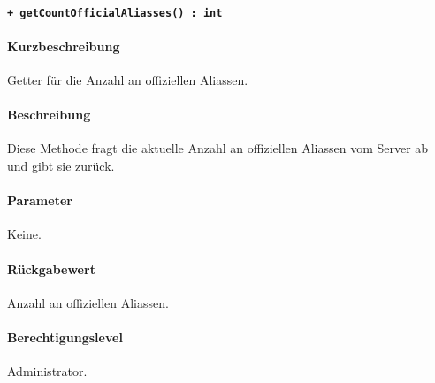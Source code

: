 \paragraph{\texttt{+ getCountOfficialAliasses() : int}}\label{AP_Backend_getCountOfficialAliasses}%
\paragraph*{Kurzbeschreibung}
Getter für die Anzahl an offiziellen Aliassen.
\paragraph*{Beschreibung}
Diese Methode fragt die aktuelle Anzahl an offiziellen Aliassen vom Server ab und gibt sie zurück.
\paragraph*{Parameter}
Keine.
\paragraph*{Rückgabewert}
Anzahl an offiziellen Aliassen.
\paragraph*{Berechtigungslevel}
Administrator.